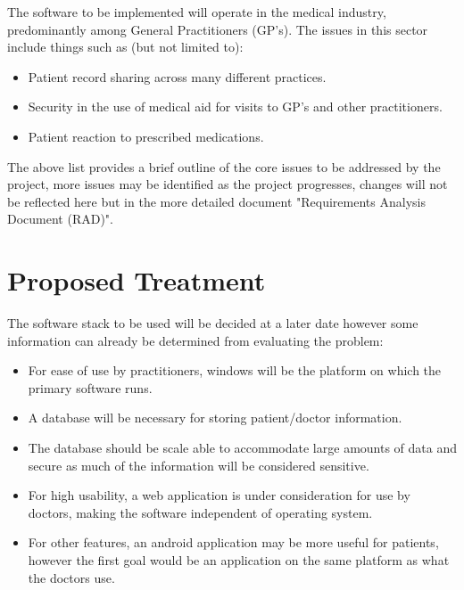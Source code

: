 \documentclass[a4paper]{article}
\begin{document}
The software to be implemented will operate in the medical industry, predominantly among General Practitioners (GP's). The issues in this sector include things such as (but not limited to):

\begin{itemize}

\item Patient record sharing across many different practices.

\item Security in the use of medical aid for visits to GP's and other practitioners.

\item Patient reaction to prescribed medications.

\end{itemize}

The above list provides a brief outline of the core issues to be addressed by the project, more issues may be identified as the project progresses, changes will not be reflected here but in the more detailed document "Requirements Analysis Document (RAD)".

\section*{Proposed Treatment}

The software stack to be used will be decided at a later date however some information can already be determined from evaluating the problem:

\begin{itemize}

\item For ease of use by practitioners, windows will be the platform on which the primary software runs.

\item A database will be necessary for storing patient/doctor information.

\item The database should be scale able to accommodate large amounts of data and secure as much of the information will be considered sensitive.

\item For high usability, a web application is under consideration for use by doctors, making the software independent of operating system.

\item For other features, an android application may be more useful for patients, however the first goal would be an application on the same platform as what the doctors use.

\end{itemize}
\end{document}
